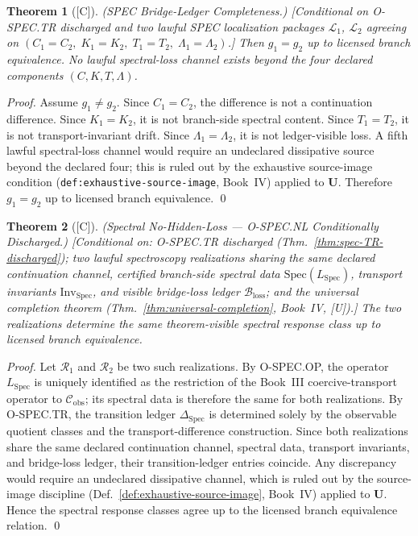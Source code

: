 \documentclass[12pt,oneside]{amsbook}
\theoremstyle{plain}
\newtheorem{theorem}{Theorem}[section]
\theoremstyle{definition}
\theoremstyle{remark}
\newcommand{\status}[1]{\textup{[#1]}}
\begin{document}
\begin{theorem}[\status{C}]\label{thm:spec-BLC}
\textup{(SPEC Bridge-Ledger Completeness.)}
\textup{[Conditional on O-SPEC.TR discharged and two lawful SPEC
localization packages $\mathcal{L}_1$, $\mathcal{L}_2$ agreeing on
$(C_1=C_2,\; K_1=K_2,\; T_1=T_2,\; \Lambda_1=\Lambda_2)$.]}
Then $g_1 = g_2$ up to licensed branch equivalence.
No lawful spectral-loss channel exists beyond the four declared
components $(C, K, T, \Lambda)$.
\end{theorem}

\begin{proof}
Assume $g_1 \neq g_2$. Since $C_1=C_2$, the difference is not a
continuation difference. Since $K_1=K_2$, it is not branch-side
spectral content. Since $T_1=T_2$, it is not transport-invariant
drift. Since $\Lambda_1=\Lambda_2$, it is not ledger-visible loss.
A fifth lawful spectral-loss channel would require an undeclared
dissipative source beyond the declared four; this is ruled out by the
exhaustive source-image condition (\texttt{def:exhaustive-source-image},
Book~IV) applied to $\mathbf{U}$. Therefore $g_1 = g_2$ up to
licensed branch equivalence.
\qed
\end{proof}


\begin{theorem}[\status{C}]\label{thm:spec-NL-discharged}
\textup{(Spectral No-Hidden-Loss --- O-SPEC.NL Conditionally Discharged.)}
\textup{[Conditional on: O-SPEC.TR discharged
(Thm.~\ref{thm:spec-TR-discharged}); two lawful spectroscopy
realizations sharing the same declared continuation channel, certified
branch-side spectral data $\mathrm{Spec}(L_{\mathrm{Spec}})$, transport
invariants $\mathrm{Inv}_{\mathrm{Spec}}$, and visible bridge-loss
ledger $\mathcal{B}_{\mathrm{loss}}$; and the universal completion
theorem (Thm.~\ref{thm:universal-completion}, Book~IV, [U]).]}
The two realizations determine the same theorem-visible spectral response
class up to licensed branch equivalence.
\end{theorem}

\begin{proof}
Let $\mathcal{R}_1$ and $\mathcal{R}_2$ be two such realizations.
By O-SPEC.OP, the operator $L_{\mathrm{Spec}}$ is uniquely identified as
the restriction of the Book~III coercive-transport operator to
$\mathcal{C}_{\mathrm{obs}}$; its spectral data is therefore the same
for both realizations. By O-SPEC.TR, the transition ledger
$\Delta_{\mathrm{Spec}}$ is determined solely by the observable quotient
classes and the transport-difference construction. Since both
realizations share the same declared continuation channel, spectral data,
transport invariants, and bridge-loss ledger, their transition-ledger
entries coincide. Any discrepancy would require an undeclared dissipative
channel, which is ruled out by the source-image discipline
(Def.~\ref{def:exhaustive-source-image}, Book~IV) applied to
$\mathbf{U}$. Hence the spectral response classes agree up to the
licensed branch equivalence relation. \qed
\end{proof}
\end{document}
